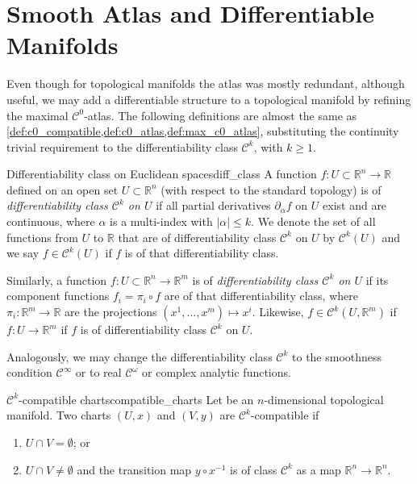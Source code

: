 \section{Smooth Atlas and Differentiable Manifolds}

Even though for topological manifolds the atlas was mostly redundant, although useful, we may add a differentiable structure to a topological manifold by refining the maximal \(\mathcal{C}^0\)-atlas. The following definitions are almost the same as \cref{def:c0_compatible,def:c0_atlas,def:max_c0_atlas}, substituting the continuity trivial requirement to the differentiability class \(\mathcal{C}^k\), with \(k \geq 1\).
\begin{definition}{Differentiability class on Euclidean spaces}{diff_class}
    A function \(f : U \subset \mathbb{R}^n \to \mathbb{R}\) defined on an open set \(U\subset \mathbb{R}^n\) (with respect to the standard topology) is of \emph{differentiability class \(\mathcal{C}^k\) on \(U\)} if all partial derivatives \(\partial_\alpha f\) on \(U\) exist and are continuous, where \(\alpha\) is a multi-index with \(|\alpha| \leq k\). We denote the set of all functions from \(U\) to \(\mathbb{R}\) that are of differentiability class \(\mathcal{C}^k\) on \(U\) by \(\mathcal{C}^k(U)\) and we say \(f \in \mathcal{C}^k(U)\) if \(f\) is of that differentiability class.

    Similarly, a function \(f : U \subset \mathbb{R}^n \to \mathbb{R}^m\) is of \emph{differentiability class \(\mathcal{C}^k\) on \(U\)} if its component functions \(f_i = \pi_i \circ f\) are of that differentiability class, where \(\pi_i : \mathbb{R}^m \to \mathbb{R}\) are the projections \((x^1, \dots, x^m) \mapsto x^i\). Likewise, \(f \in \mathcal{C}^k(U, \mathbb{R}^m)\) if \(f : U \to \mathbb{R}^m\) if \(f\) is of differentiability class \(\mathcal{C}^k\) on \(U\).
\end{definition}
Analogously, we may change the differentiability class \(\mathcal{C}^k\) to the smoothness condition \(\mathcal{C}^\infty\) or to real \(\mathcal{C}^\omega\) or complex analytic functions.

\begin{definition}{\(\mathcal{C}^k\)-compatible charts}{compatible_charts}
    Let  be an \(n\)-dimensional topological manifold. Two charts \((U, x)\) and \((V, y)\) are \(\mathcal{C}^k\)-compatible if
    \begin{enumerate}[label=(\alph*)]
        \item \(U \cap V = \emptyset\); or
        \item \(U \cap V \neq \emptyset\) and the transition map \(y \circ x^{-1}\) is of class \(\mathcal{C}^k\) as a map \(\mathbb{R}^n \to \mathbb{R}^n\).
    \end{enumerate}
\end{definition}

